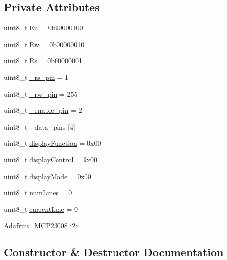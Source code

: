 \subsection*{Private Attributes}
\begin{DoxyCompactItemize}
\item 
uint8\+\_\+t \hyperlink{class_l_c_d_a9689016d04e674b7845c2a53be7a1444}{En} = 0b00000100
\item 
uint8\+\_\+t \hyperlink{class_l_c_d_adfd73ce4fc19ae4d852bb07197201dd0}{Rw} = 0b00000010
\item 
uint8\+\_\+t \hyperlink{class_l_c_d_ab110d70390d7ee2d58a090e2b30196ad}{Rs} = 0b00000001
\item 
uint8\+\_\+t \hyperlink{class_l_c_d_ae6261bf99bcd8b2364f97e9e11c58502}{\+\_\+rs\+\_\+pin} = 1
\item 
uint8\+\_\+t \hyperlink{class_l_c_d_a7bbb2365fb389314e5f457a590d8dd5e}{\+\_\+rw\+\_\+pin} = 255
\item 
uint8\+\_\+t \hyperlink{class_l_c_d_a35aa36f96baa53a9f6b0a825b6d0366d}{\+\_\+enable\+\_\+pin} = 2
\item 
uint8\+\_\+t \hyperlink{class_l_c_d_accee0498e7736561a109a98fe58183b7}{\+\_\+data\+\_\+pins} \mbox{[}4\mbox{]}
\item 
uint8\+\_\+t \hyperlink{class_l_c_d_adef97dff16494aa9e1a5f37003ea0204}{display\+Function} = 0x00
\item 
uint8\+\_\+t \hyperlink{class_l_c_d_ad57d2b520a80da4ffcbb321fd5e07067}{display\+Control} = 0x00
\item 
uint8\+\_\+t \hyperlink{class_l_c_d_ab753a72be1a77a16b51844b4d0752500}{display\+Mode} = 0x00
\item 
uint8\+\_\+t \hyperlink{class_l_c_d_aa9a72eb7fc8bca5d8e429fa1988f26cc}{num\+Lines} = 0
\item 
uint8\+\_\+t \hyperlink{class_l_c_d_ab6514db16bf7b904e988b198d944e003}{current\+Line} = 0
\item 
\hyperlink{class_adafruit___m_c_p23008}{Adafruit\+\_\+\+M\+C\+P23008} \hyperlink{class_l_c_d_acf92e89c3c9c9b1c99dab9f9bf72cb20}{i2c\+\_\+}
\end{DoxyCompactItemize}


\subsection{Constructor \& Destructor Documentation}
\mbox{\label{class_l_c_d_a00bb2db1390721abc7b24ac4b8c276c8}} 
